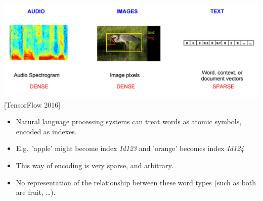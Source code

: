 \documentclass[11pt, a4paper, landscape]{article}
\begin{document}
\NewPage{} 


\begin{center}
  \includegraphics[width=.7\linewidth]{../article/img/audio-image-text}\\
  {[}TensorFlow 2016{]}
\end{center}
\vfill
\begin{itemize}
\item Natural language processing systems can treat words as atomic symbols, encoded as indexes.
\item E.g.\ 'apple' might become index \textit{Id123} and 'orange' becomes index \textit{Id124}
\item This way of encoding is very sparse, and arbitrary.
\item No representation of the relationship between these word types (such as both are fruit, \dots).
\end{itemize}
\vfill

\NewPage{} 
\hypertarget{sli:word-embeddings}{}
\end{document}
